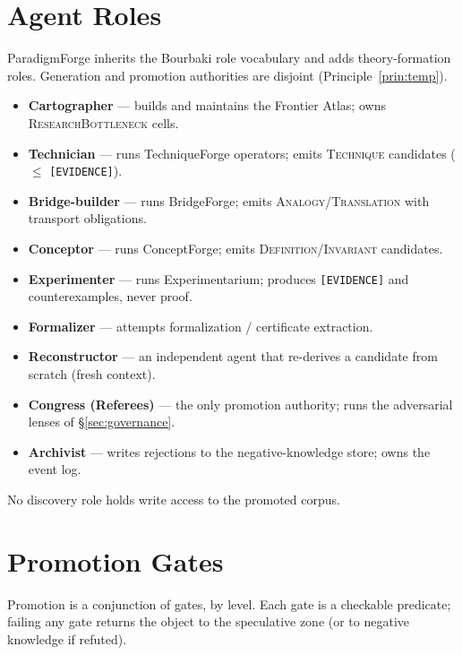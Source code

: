 \documentclass[11pt]{article}
\theoremstyle{definition}
\theoremstyle{remark}
\newcommand{\state}[1]{\texttt{[#1]}}
\newcommand{\ntype}[1]{\textsc{#1}}
\newcommand{\PF}{ParadigmForge}
\begin{document}
\section{Agent Roles}
\label{app:roles}

\PF{} inherits the Bourbaki role vocabulary and adds theory-formation roles. Generation and
promotion authorities are disjoint (Principle~\ref{prin:temp}).

\begin{itemize}[leftmargin=1.4em,itemsep=1pt]
  \item \textbf{Cartographer} --- builds and maintains the Frontier Atlas; owns \ntype{ResearchBottleneck} cells.
  \item \textbf{Technician} --- runs TechniqueForge operators; emits \ntype{Technique} candidates ($\le$ \state{EVIDENCE}).
  \item \textbf{Bridge-builder} --- runs BridgeForge; emits \ntype{Analogy}/\ntype{Translation} with transport obligations.
  \item \textbf{Conceptor} --- runs ConceptForge; emits \ntype{Definition}/\ntype{Invariant} candidates.
  \item \textbf{Experimenter} --- runs Experimentarium; produces \state{EVIDENCE} and counterexamples, never proof.
  \item \textbf{Formalizer} --- attempts formalization / certificate extraction.
  \item \textbf{Reconstructor} --- an independent agent that re-derives a candidate from scratch (fresh context).
  \item \textbf{Congress (Referees)} --- the only promotion authority; runs the adversarial lenses of \S\ref{sec:governance}.
  \item \textbf{Archivist} --- writes rejections to the negative-knowledge store; owns the event log.
\end{itemize}
No discovery role holds write access to the promoted corpus.

\section{Promotion Gates}
\label{app:gates}

Promotion is a conjunction of gates, by level. Each gate is a checkable predicate; failing any gate
returns the object to the speculative zone (or to negative knowledge if refuted).
\end{document}
